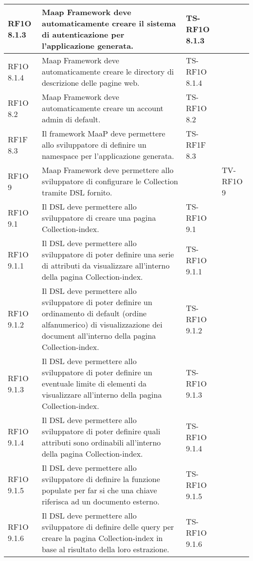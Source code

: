 \begin{center}
\begin{longtable}{| p{2cm} | p{6cm} | p{2.5cm} | p{2.5cm} | }
        RF1O 8.1.3 & 
        Maap Framework deve automaticamente creare il sistema di autenticazione per l’applicazione generata. & TS-RF1O 8.1.3 & \\ \hline 
        RF1O 8.1.4 & 
        Maap Framework deve automaticamente creare le directory di descrizione delle pagine web. & TS-RF1O 8.1.4 & \\ \hline 
        RF1O 8.2 & 
        Maap Framework deve automaticamente creare un account admin di default. & TS-RF1O 8.2 & \\ \hline 
        RF1F 8.3 & 
        Il framework MaaP deve permettere allo sviluppatore di definire un namespace per l’applicazione generata. & TS-RF1F 8.3 & \\ \hline 
        RF1O 9 & 
        Maap Framework deve permettere allo sviluppatore di configurare le Collection tramite DSL fornito. &  & TV-RF1O 9 \\ \hline 
        RF1O 9.1 & 
        Il DSL deve permettere allo sviluppatore di creare una pagina Collection-index. & TS-RF1O 9.1 & \\ \hline 
        RF1O 9.1.1 & 
        Il DSL deve permettere allo sviluppatore di poter definire una serie di attributi da visualizzare all’interno della pagina Collection-index. & TS-RF1O 9.1.1 & \\ \hline 
        RF1O 9.1.2 & 
        Il DSL deve permettere allo sviluppatore di poter definire un ordinamento di default (ordine alfanumerico) di visualizzazione dei document all'interno della pagina Collection-index. & TS-RF1O 9.1.2 & \\ \hline 
        RF1O 9.1.3 & 
        Il DSL deve permettere allo sviluppatore di poter definire un eventuale limite di elementi da visualizzare all’interno della pagina Collection-index. & TS-RF1O 9.1.3 & \\ \hline 
        RF1O 9.1.4 & 
        Il DSL deve permettere allo sviluppatore di poter definire quali attributi sono ordinabili all’interno della pagina Collection-index. & TS-RF1O 9.1.4 & \\ \hline 
        RF1O 9.1.5 & 
        Il DSL deve permettere allo sviluppatore di definire la funzione populate per far si che una chiave riferisca ad un documento esterno. & TS-RF1O 9.1.5 & \\ \hline 
        RF1O 9.1.6 & 
        Il DSL deve permettere allo sviluppatore di definire delle query per creare la pagina Collection-index in base al risultato della loro estrazione. & TS-RF1O 9.1.6 & \\ \hline 

\end{longtable}
\end{center}
